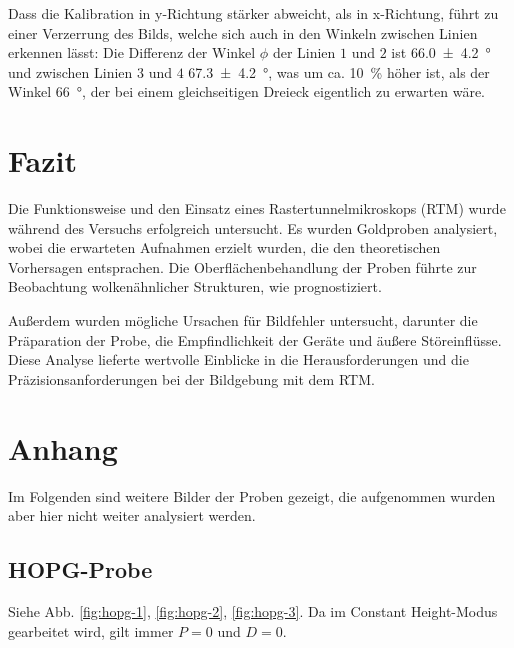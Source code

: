 \documentclass{article}
\begin{document}
Dass die Kalibration in y-Richtung stärker abweicht, als in x-Richtung,
führt zu einer Verzerrung des Bilds, welche sich auch in den Winkeln zwischen Linien erkennen lässt: Die Differenz der
Winkel $\phi$ der Linien $1$ und $2$ ist \SI{66.0\pm 4.2}{\degree} und zwischen Linien $3$ und $4$ \SI{67.3\pm 4.2}{\degree},
was um ca. \SI{10}{\percent} höher ist, als der Winkel \SI{66}{\degree}, der bei einem gleichseitigen Dreieck eigentlich zu
erwarten wäre.


\clearpage
\section{Fazit}
Die Funktionsweise und den Einsatz eines Rastertunnelmikroskops (RTM) wurde während des Versuchs erfolgreich untersucht. Es wurden Goldproben analysiert, wobei die erwarteten Aufnahmen erzielt wurden, die den theoretischen Vorhersagen entsprachen. Die Oberflächenbehandlung der Proben führte zur Beobachtung wolkenähnlicher Strukturen, wie prognostiziert. 

Außerdem wurden mögliche Ursachen für Bildfehler untersucht, darunter die Präparation der Probe, die Empfindlichkeit der Geräte und äußere Störeinflüsse. Diese Analyse lieferte wertvolle Einblicke in die Herausforderungen und die Präzisionsanforderungen bei der Bildgebung mit dem RTM.







\clearpage
\section{Anhang}
Im Folgenden sind weitere Bilder der Proben gezeigt, die aufgenommen wurden aber hier nicht weiter analysiert werden.

\subsection{HOPG-Probe}
Siehe Abb. \ref{fig:hopg-1}, \ref{fig:hopg-2}, \ref{fig:hopg-3}. Da im Constant Height-Modus gearbeitet wird, gilt immer $P=0$ und $D=0$.
\end{document}
